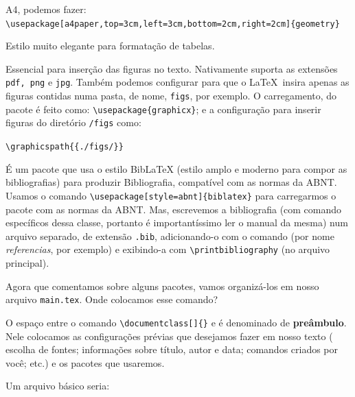 \begin{description}
    A4, podemos fazer:\\
    {\small \Verb|\usepackage[a4paper,top=3cm,left=3cm,bottom=2cm,right=2cm]{geometry}|}
  \item[\hrefB{https://ctan.org/pkg/booktabs}{\sffamily booktabs}] Estilo muito 
   elegante para formatação de tabelas.
  \item[\hrefB{https://ctan.org/pkg/graphicx}{graphicx}] Essencial para inserção
    das figuras no texto.
    Nativamente suporta as extensões \texttt{pdf, png} e \texttt{jpg}.
    Também podemos configurar para que o \LaTeX\ insira apenas as figuras 
    contidas numa pasta, de nome, \texttt{figs}, por exemplo. 
    O carregamento, do pacote é feito como: \Verb|\usepackage{graphicx}|; e a 
    configuração para inserir figuras do diretório \texttt{/figs} como:
    \begin{center}
      \Verb|\graphicspath{{./figs/}}|
    \end{center}
  \item[\hrefB{https://github.com/abntex/biblatex-abnt}{biblatex-abnt}] É um 
    pacote que usa o estilo BibLaTeX (estilo amplo e moderno para compor as 
    bibliografias) para produzir Bibliografia, compatível com as normas da ABNT.
    Usamos o comando \Verb|\usepackage[style=abnt]{biblatex}| para carregarmos 
    o pacote com as normas da ABNT.
    Mas, escrevemos a bibliografia (com comando específicos dessa classe, portanto
    é importantíssimo ler o manual da mesma) num arquivo separado, de extensão 
    \texttt{.bib}, adicionando-o com o comando 
    \Verb|| (por nome \textit{referencias}, por 
    exemplo) e exibindo-a com \Verb|\printbibliography| (no arquivo principal).
\end{description}

Agora que comentamos sobre alguns pacotes, vamos organizá-los em nosso arquivo 
\texttt{main.tex}.
Onde colocamos esse comando?

O espaço entre o comando \Verb|\documentclass[]{}| e \Verb|| é 
denominado de \textsf{\textbf{preâmbulo}}.
Nele colocamos as configurações prévias que desejamos fazer em nosso texto (
escolha de fontes; informações sobre título, autor e data; comandos criados por 
você; etc.) e os pacotes que usaremos. 

Um arquivo básico seria: 

